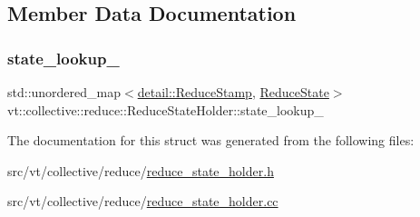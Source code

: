 \subsection{Member Data Documentation}
\mbox{\label{structvt_1_1collective_1_1reduce_1_1_reduce_state_holder_ab30bde72498ebf851969c1914c3378c6}} 
\subsubsection{\texorpdfstring{state\+\_\+lookup\+\_\+}{state\_lookup\_}}
{\footnotesize\ttfamily std\+::unordered\+\_\+map$<$\hyperlink{namespacevt_1_1collective_1_1reduce_1_1detail_abcd205dec83706f347d55c7528bf2664}{detail\+::\+Reduce\+Stamp}, \hyperlink{structvt_1_1collective_1_1reduce_1_1_reduce_state}{Reduce\+State}$>$ vt\+::collective\+::reduce\+::\+Reduce\+State\+Holder\+::state\+\_\+lookup\+\_\+\hspace{0.3cm}{\ttfamily [private]}}



The documentation for this struct was generated from the following files\+:\begin{DoxyCompactItemize}
\item 
src/vt/collective/reduce/\hyperlink{reduce__state__holder_8h}{reduce\+\_\+state\+\_\+holder.\+h}\item 
src/vt/collective/reduce/\hyperlink{reduce__state__holder_8cc}{reduce\+\_\+state\+\_\+holder.\+cc}\end{DoxyCompactItemize}

